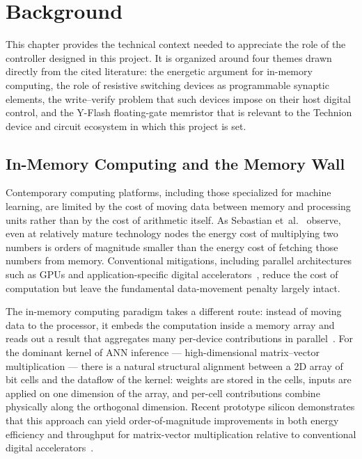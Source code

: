 
\chapter{Background}
\label{ch:background}

This chapter provides the technical context needed to appreciate the role
of the controller designed in this project. It is organized around four
themes drawn directly from the cited literature: the energetic argument
for in-memory computing, the role of resistive switching devices as
programmable synaptic elements, the write--verify problem that such devices
impose on their host digital control, and the Y-Flash floating-gate
memristor that is relevant to the Technion device and circuit ecosystem
in which this project is set.

\section{In-Memory Computing and the Memory Wall}
\label{sec:bg-imc}

Contemporary computing platforms, including those specialized for machine
learning, are limited by the cost of moving data between memory and
processing units rather than by the cost of arithmetic itself. As Sebastian
et~al.~\cite{Sebastian2020IMC} observe, even at relatively mature technology
nodes the energy cost of multiplying two numbers is orders of magnitude
smaller than the energy cost of fetching those numbers from memory.
Conventional mitigations, including parallel architectures such as GPUs and
application-specific digital
accelerators~\cite{Ielmini2018RRAM, Sebastian2020IMC}, reduce the cost of
computation but leave the fundamental data-movement penalty largely intact.

The in-memory computing paradigm takes a different route: instead of moving
data to the processor, it embeds the computation inside a memory array and
reads out a result that aggregates many per-device contributions in
parallel~\cite{Sebastian2020IMC, Verma2019IMC}. For the dominant kernel of
ANN inference --- high-dimensional matrix--vector multiplication --- there
is a natural structural alignment between a 2D array of bit cells and the
dataflow of the kernel: weights are stored in the cells, inputs are applied
on one dimension of the array, and per-cell contributions combine physically
along the orthogonal dimension. Recent prototype silicon demonstrates that
this approach can yield order-of-magnitude improvements in both energy
efficiency and throughput for matrix-vector multiplication relative to
conventional digital accelerators~\cite{Verma2019IMC}.

